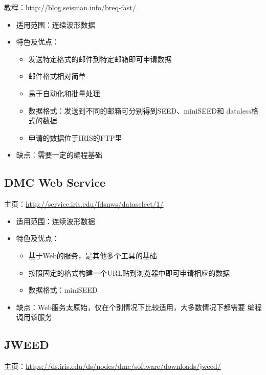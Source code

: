 教程：\url{http://blog.seisman.info/breq-fast/}

\begin{itemize}
\item 适用范围：连续波形数据
\item 特色及优点：
    \begin{itemize}
    \item 发送特定格式的邮件到特定邮箱即可申请数据
    \item 邮件格式相对简单
    \item 易于自动化和批量处理
    \item 数据格式：发送到不同的邮箱可分别得到SEED、miniSEED和
        dataless格式的数据
    \item 申请的数据位于IRIS的FTP里
    \end{itemize}
\item 缺点：需要一定的编程基础
\end{itemize}

\subsection{DMC Web Service}
主页：\url{http://service.iris.edu/fdsnws/dataselect/1/}

\begin{itemize}
\item 适用范围：连续波形数据
\item 特色及优点：
    \begin{itemize}
    \item 基于Web的服务，是其他多个工具的基础
    \item 按照固定的格式构建一个URL贴到浏览器中即可申请相应的数据
    \item 数据格式：miniSEED
    \end{itemize}
\item 缺点：Web服务太原始，仅在个别情况下比较适用，大多数情况下都需要
    编程调用该服务
\end{itemize}

\subsection{JWEED}
主页：\url{https://ds.iris.edu/ds/nodes/dmc/software/downloads/jweed/}

